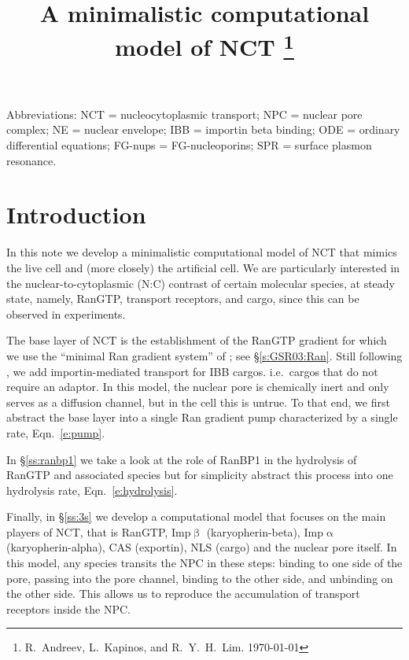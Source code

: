 \documentclass[12pt,notitlepage]{article}
\title{%
A minimalistic computational model of NCT%
\thanks{%
R.~Andreev, L.~Kapinos, and R.~Y.~H.~Lim.
\today
}}
\date{}
\begin{document}
\maketitle


{
\small
Abbreviations:
NCT = nucleocytoplasmic transport;
NPC = nuclear pore complex;
NE = nuclear envelope;
IBB = importin beta binding; 
ODE = ordinary differential equations;
FG-nups = FG-nucleoporins;
SPR = surface plasmon resonance.
}

\section{Introduction}


%

In this note we develop a minimalistic computational
model of 
NCT
that mimics
the live cell and (more closely) the artificial cell.
%
%
We are particularly
interested in 
the nuclear-to-cytoplasmic (N:C) contrast
of 
certain molecular species,
at steady state,
namely,
RanGTP,
transport receptors,
and
cargo,
since this can be observed in experiments.

%

The base layer of NCT is the establishment of 
the RanGTP gradient
for which we use the ``minimal Ran gradient system''
of \cite{GoerlichSeewaldRibbeck2003};
see \S\ref{s:GSR03:Ran}.
%
%
Still following \cite{GoerlichSeewaldRibbeck2003},
we add importin-mediated transport 
for IBB cargos.
%
i.e.~cargos that do not require an adaptor.
%
%
%
In this model,
the nuclear pore is chemically inert 
and only serves as a diffusion channel,
but in the cell this is untrue.
%
To that end,
we first abstract
the base layer into a single
Ran gradient pump characterized
by a single rate, Eqn.~\ref{e:pump}. 

%

In \S\ref{ss:ranbp1} we take a look at the role
of RanBP1
in the hydrolysis of RanGTP
and associated species
but
for simplicity
abstract this process into 
one hydrolysis rate, Eqn.~\eqref{e:hydrolysis}.

%

Finally, in \S\ref{ss:3s}
we develop 
a computational model
that focuses
on the main players of NCT,
that is
{RanGTP},
{Imp$\upbeta$} (karyopherin-beta),
{Imp$\upalpha$} (karyopherin-alpha),
{CAS} (exportin),
{NLS} (cargo)
and
the nuclear pore itself.
%
%
%
In this model,
any species transits the NPC
in these steps:
binding to one side of the pore,
passing into the pore channel,
binding to the other side,
and unbinding on the other side.
%
%
This allows us
to reproduce the accumulation
of transport receptors
inside the NPC.
\end{document}
